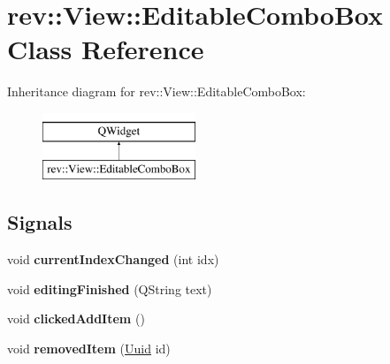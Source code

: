\hypertarget{classrev_1_1_view_1_1_editable_combo_box}{}\section{rev\+::View\+::Editable\+Combo\+Box Class Reference}
\label{classrev_1_1_view_1_1_editable_combo_box}
Inheritance diagram for rev\+::View\+::Editable\+Combo\+Box\+:\begin{figure}[H]
\begin{center}
\leavevmode
\includegraphics[height=2.000000cm]{classrev_1_1_view_1_1_editable_combo_box}
\end{center}
\end{figure}
\subsection*{Signals}
\begin{DoxyCompactItemize}
\item 
\mbox{\label{classrev_1_1_view_1_1_editable_combo_box_a187624b00c736c7ee6b33da14ca3437e}} 
void {\bfseries current\+Index\+Changed} (int idx)
\item 
\mbox{\label{classrev_1_1_view_1_1_editable_combo_box_a18f387e45e5dbd93374f868dba923e12}} 
void {\bfseries editing\+Finished} (Q\+String text)
\item 
\mbox{\label{classrev_1_1_view_1_1_editable_combo_box_aff24ed02b5142277698b667aa3cd7607}} 
void {\bfseries clicked\+Add\+Item} ()
\item 
\mbox{\label{classrev_1_1_view_1_1_editable_combo_box_a8a61b5676c2095a5ac37cc26fd761431}} 
void {\bfseries removed\+Item} (\mbox{\hyperlink{classrev_1_1_uuid}{Uuid}} id)
\end{DoxyCompactItemize}
